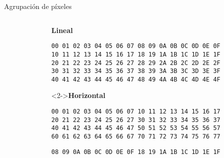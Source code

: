 \begin{frame}[fragile]{Agrupación de píxeles}
    \begin{columns}
    \begin{column}{0.1\textwidth}
    \end{column}
    \begin{column}{0.9\textwidth}
        {\textbf{Lineal}}
        \begin{lstlisting}[basicstyle=\ttfamily\footnotesize]
00 01 02 03 04 05 06 07 08 09 0A 0B 0C 0D 0E 0F
10 11 12 13 14 15 16 17 18 19 1A 1B 1C 1D 1E 1F
20 21 22 23 24 25 26 27 28 29 2A 2B 2C 2D 2E 2F
30 31 32 33 34 35 36 37 38 39 3A 3B 3C 3D 3E 3F
40 41 42 43 44 45 46 47 48 49 4A 4B 4C 4D 4E 4F
        \end{lstlisting}
        \begin{uncoverenv}<2->{\textbf{Horizontal}}
        \begin{lstlisting}[basicstyle=\ttfamily\footnotesize\color{red},
            belowskip=-0.5\baselineskip]
00 01 02 03 04 05 06 07 10 11 12 13 14 15 16 17
20 21 22 23 24 25 26 27 30 31 32 33 34 35 36 37
40 41 42 43 44 45 46 47 50 51 52 53 54 55 56 57
60 61 62 63 64 65 66 67 70 71 72 73 74 75 76 77\end{lstlisting}
        \begin{lstlisting}[basicstyle=\ttfamily\footnotesize\color{blue}]
08 09 0A 0B 0C 0D 0E 0F 18 19 1A 1B 1C 1D 1E 1F
        \end{lstlisting}\end{uncoverenv}
    \end{column}
    \end{columns}
\end{frame}

